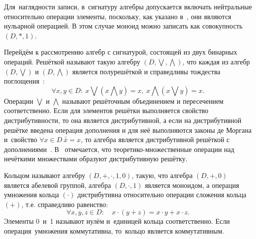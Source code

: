 Для~наглядности записи, в~сигнатуру алгебры допускается включать нейтральные относительно операции элементы, поскольку, как указано в~\cite{Bauman_DM}, они являются нульарной операцией. В этом случае моноид можно записать как совокупность $\left( D,*,1 \right)$.

Перейдём к рассмотрению алгебр с сигнатурой, состоящей из двух бинарных операций. Решёткой называют такую алгебру $\left( D, \bigvee, \bigwedge \right)$, что каждая из алгебр $\left( D, \bigvee\right)$ и $\left( D, \bigwedge \right)$ является полурешёткой и справедливы тождества поглощения~\cite{Hybrid_Systems}:
\begin{equation*}
  \forall x,y\in D:\ x \bigvee \left( x \bigwedge y \right) = x,\ x \bigwedge \left(x \bigvee y \right) = x.
\end{equation*}
Операции $\bigvee$ и $\bigwedge$ называют решёточным объединением и пересечением соответственно. Если для элементов решётки выполняется свойство дистрибутивности, то она является дистрибутивной, а если на дистрибутивной решётке введена операция дополнения и для неё выполняются законы де Моргана и~свойство $\forall x\in D\ \overline{\bar x}=x$, то алгебра является дистрибутивной решёткой с дополнениями~\cite{Lipetsk}. В~\cite{Kaufmann, Pospelov} отмечается, что теоретико-множественные операции над нечёткими множествами образуют дистрибутивную решётку.

Кольцом называют алгебру $\left( D,+,\cdot ,1,0 \right)$, такую, что алгебра $\left( D,+,0 \right)$ является абелевой группой, алгебра $\left( D,\cdot ,1 \right)$ является моноидом, а операция умножения кольца $\left( \cdot  \right)$ дистрибутивна относительно операции сложения кольца $\left( + \right)$, т.е. справедливо равенство:
\begin{equation*}
	\forall x,y,z\in D:\quad x\cdot \left( y+z \right)=x\cdot y+x\cdot z.
\end{equation*}
Элементы 0~и~1 называют нулём и~единицей кольца соответственно. Если операция~умножения коммутативна, то~кольцо является коммутативным.

